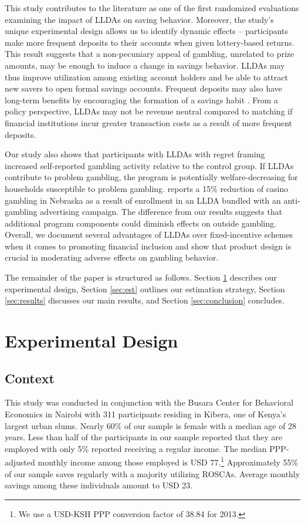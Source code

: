 \documentclass[12pt]{article}
\begin{document}
	This study contributes to the literature as one of the first randomized evaluations examining the impact of LLDAs on saving behavior. Moreover, the study's unique experimental design allows us to identify dynamic effects -- participants make more frequent deposits to their accounts when given lottery-based returns. This result suggests that a non-pecuniary appeal of gambling, unrelated to prize amounts, may be enough to induce a change in savings behavior. LLDAs may thus improve utilization among existing account holders and be able to attract new savers to open formal savings accounts. Frequent deposits may also have long-term benefits by encouraging the formation of a savings habit . From a policy perspective, LLDAs may not be revenue neutral compared to matching if financial institutions incur greater transaction costs as a result of more frequent deposits.

	Our study also shows that participants with LLDAs with regret framing increased self-reported gambling activity relative to the control group. If LLDAs contribute to problem gambling, the program is potentially welfare-decreasing for households susceptible to problem gambling.  reports a 15\% reduction of casino gambling in Nebraska as a result of enrollment in an LLDA bundled with an anti-gambling advertising campaign. The difference from our results suggests that additional program components could diminish effects on outside gambling. Overall, we document several advantages of LLDAs over fixed-incentive schemes when it comes to promoting financial inclusion and show that product design is crucial in moderating adverse effects on gambling behavior.

	The remainder of the paper is structured as follows. Section \ref{sec:design} describes our experimental design, Section \ref{sec:est} outlines our estimation strategy, Section \ref{sec:results} discusses our main results, and Section \ref{sec:conclusion} concludes.

\section{Experimental Design} \label{sec:design}

	\subsection{Context}

		This study was conducted in conjunction with the Busara Center for Behavioral Economics in Nairobi with 311 participants residing in Kibera, one of Kenya's largest urban slums. Nearly 60\% of our sample is female with a median age of 28 years. Less than half of the participants in our sample reported that they are employed with only 5\% reported receiving a regular income. The median PPP-adjusted monthly income among those employed is USD 77.\footnote{We use a USD-KSH PPP conversion factor of 38.84 for 2013.} Approximately 55\% of our sample saves regularly with a majority utilizing ROSCAs. Average monthly savings among these individuals amount to USD 23.
\end{document}
